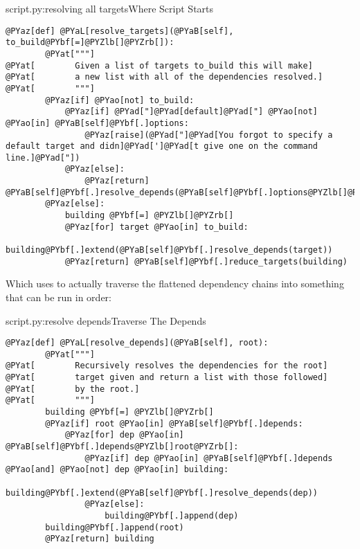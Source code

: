 \begin{code}{script.py:resolving all targets}{Where Script Starts}
\begin{Verbatim}[commandchars=@\[\]]
    @PYaz[def] @PYaL[resolve_targets](@PYaB[self], to_build@PYbf[=]@PYZlb[]@PYZrb[]):
        @PYat["""]
@PYat[        Given a list of targets to_build this will make]
@PYat[        a new list with all of the dependencies resolved.]
@PYat[        """]
        @PYaz[if] @PYao[not] to_build: 
            @PYaz[if] @PYad["]@PYad[default]@PYad["] @PYao[not] @PYao[in] @PYaB[self]@PYbf[.]options:
                @PYaz[raise](@PYad["]@PYad[You forgot to specify a default target and didn]@PYad[']@PYad[t give one on the command line.]@PYad["])
            @PYaz[else]:
                @PYaz[return] @PYaB[self]@PYbf[.]resolve_depends(@PYaB[self]@PYbf[.]options@PYZlb[]@PYad["]@PYad[default]@PYad["]@PYZrb[])
        @PYaz[else]:
            building @PYbf[=] @PYZlb[]@PYZrb[]
            @PYaz[for] target @PYao[in] to_build:
                building@PYbf[.]extend(@PYaB[self]@PYbf[.]resolve_depends(target))
            @PYaz[return] @PYaB[self]@PYbf[.]reduce_targets(building)
\end{Verbatim}

\end{code}

Which uses  to actually traverse the flattened
dependency chains into something that can be run in order:

\begin{code}{script.py:resolve depends}{Traverse The Depends}
\begin{Verbatim}[commandchars=@\[\]]
    @PYaz[def] @PYaL[resolve_depends](@PYaB[self], root):
        @PYat["""]
@PYat[        Recursively resolves the dependencies for the root]
@PYat[        target given and return a list with those followed]
@PYat[        by the root.]
@PYat[        """]
        building @PYbf[=] @PYZlb[]@PYZrb[]
        @PYaz[if] root @PYao[in] @PYaB[self]@PYbf[.]depends:
            @PYaz[for] dep @PYao[in] @PYaB[self]@PYbf[.]depends@PYZlb[]root@PYZrb[]:
                @PYaz[if] dep @PYao[in] @PYaB[self]@PYbf[.]depends @PYao[and] @PYao[not] dep @PYao[in] building:
                    building@PYbf[.]extend(@PYaB[self]@PYbf[.]resolve_depends(dep))
                @PYaz[else]:
                    building@PYbf[.]append(dep)
        building@PYbf[.]append(root)
        @PYaz[return] building
\end{Verbatim}

\end{code}


